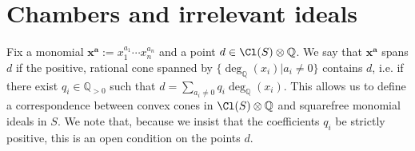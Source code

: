 \documentclass[11pt]{amsart}
\numberwithin{equation}{section}
\theoremstyle{definition}
\theoremstyle{remark}
\newcommand{\ZZ}{\mathbb Z}
\newcommand{\QQ}{\mathbb Q}
\newcommand{\defi}[1]{\textsf{#1}} %
\begin{document}

\section{Chambers and irrelevant ideals}


Fix a monomial $\mathbf{x}^{\mathbf{a}}:=x_1^{a_1}\cdots x_n^{a_n}$ and a point $d\in \Cl(S)\otimes \QQ$.  We say that \defi{$\mathbf{x}^{\mathbf{a}}$ spans $d$} if the positive, rational cone spanned by $\{\deg_{\QQ}(x_i) | a_i \ne 0\}$ contains $d$, i.e. if there exist $q_i \in \QQ_{>0}$ such that
$
d = \sum_{a_i \ne 0} q_i\deg_{\QQ}(x_i).
$
This allows us to define a correspondence between convex cones in $\Cl(S)\otimes \QQ$ and squarefree monomial ideals in $S$.  We note that, because we insist that the coefficients $q_i$ be strictly positive, this is an open condition on the points $d$.
\end{document}
